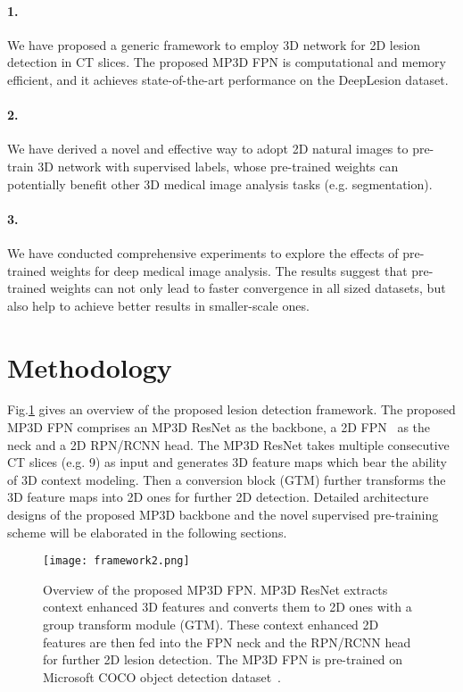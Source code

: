 \documentclass[runningheads]{llncs}
\begin{document}
\paragraph{1.} We have proposed a generic framework to employ 3D network for 2D lesion detection in CT slices. The proposed MP3D FPN is computational and memory efficient, and it achieves state-of-the-art performance on the DeepLesion dataset.
\paragraph{2.} We have derived a novel and effective way to adopt 2D natural images to pre-train 3D network with supervised labels, whose pre-trained weights can potentially benefit other 3D medical image analysis tasks (e.g. segmentation).
\paragraph{3.} We have conducted comprehensive experiments to explore the effects of pre-trained weights for deep medical image analysis. The results suggest that pre-trained weights can not only lead to faster convergence in all sized datasets, but also help to achieve better results in smaller-scale ones.


\section{Methodology}



Fig.\ref{flowchart} gives an overview of the proposed lesion detection framework.
The proposed MP3D FPN comprises an MP3D ResNet as the backbone, a 2D FPN~\cite{FPN} as the neck and a 2D RPN/RCNN head.
The MP3D ResNet takes multiple consecutive CT slices (e.g. 9) as input and generates 3D feature maps which bear the ability of 3D context modeling. 
Then a conversion block (GTM) further transforms the 3D feature maps into 2D ones for further 2D detection. 
Detailed architecture designs of the proposed MP3D backbone and the novel supervised pre-training scheme will be elaborated in the following sections.



\begin{figure}[!tbp]
\centering
\texttt{[image: framework2.png]}
\caption{Overview of the proposed MP3D FPN. MP3D ResNet extracts context enhanced 3D features and converts them to 2D ones with a group transform module (GTM). These context enhanced 2D features are then fed into the FPN neck and the RPN/RCNN head for further 2D lesion detection. The MP3D FPN is pre-trained on Microsoft COCO object detection dataset~\cite{COCO}. } \label{flowchart}
\end{figure}
\end{document}
